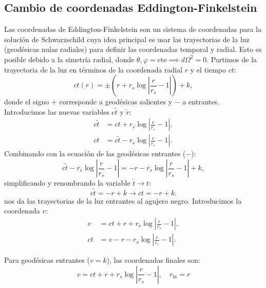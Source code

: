\subsection{Cambio de coordenadas Eddington-Finkelstein}
Las coordenadas de Eddington-Finkelstein son un sistema de coordenadas para la solución de Schwarzschild cuya idea principal es usar las trayectorias de la luz (geodésicas nulas radiales) para definir las coordenadas temporal y radial. Esto es posible debido a la simetría radial, donde \( \theta, \varphi = \text{cte} \implies d\Omega^2 = 0 \).
Partimos de la trayectoria de la luz en términos de la coordenada radial \( r \) y el tiempo \( ct \):
\begin{equation}
    ct(r) = \pm \left( r + r_s \log \left| \frac{r}{r_s} - 1 \right| \right) + k,
\end{equation}
donde el signo \( + \) corresponde a geodésicas salientes y \( - \) a entrantes. Introducimos las nuevas variables \( c\tilde{t} \) y \( \tilde{r} \):
\begin{equation}
    \begin{aligned}
        c\tilde{t} & = ct + r_s \log \left| \frac{r}{r_s} - 1 \right|,         \\
        ct         & = c\tilde{t} - r_s \log \left| \frac{r}{r_s} - 1 \right|.
    \end{aligned}
\end{equation}
Combinando con la ecuación de las geodésicas entrantes (\( - \)):
\begin{equation}
    c\tilde{t} - r_s \log \left| \frac{r}{r_s} - 1 \right| = -r - r_s \log \left| \frac{r}{r_s} - 1 \right| + k,
\end{equation}
simplificando y renombrando la variable $\tilde{t} \to t$:
\begin{equation}
    c\tilde{t} = -r + k \to ct= -r + k .
\end{equation}
nos da las trayectorias de la luz entrantes al agujero negro.
Introducimos la coordenada \( v \):
\begin{equation}
    \begin{aligned}
        v  & = ct + r + r_s \log \left| \frac{r}{r_s} - 1 \right|, \\
        ct & = v - r - r_s \log \left| \frac{r}{r_s} - 1 \right|.
    \end{aligned}
\end{equation}

Para geodésicas entrantes (\( v = k \)), las coordenadas finales son:
\begin{equation}
    \boxed{
        v = ct + r + r_s \log \left| \frac{r}{r_s} - 1 \right|, \quad
        r_{\text{in}} = r
    }
\end{equation}


